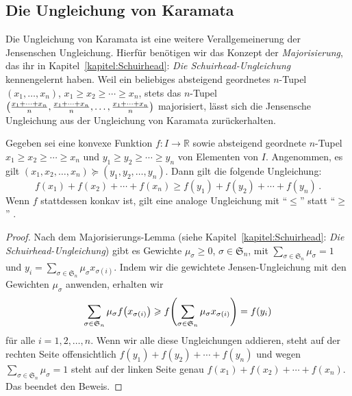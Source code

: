\subsection*{Die Ungleichung von Karamata}
Die Ungleichung von Karamata ist eine weitere Verallgemeinerung der Jensenschen Ungleichung. Hierfür benötigen wir das Konzept der \emph{Majorisierung}, das ihr in Kapitel~\ref{kapitel:Schuirhead}: \emph{Die Schuirhead-Ungleichung} kennengelernt haben. Weil ein beliebiges absteigend geordnetes $n$-Tupel $(x_1,\dotsc,x_n)$, $x_1\geqslant x_2\geqslant \dotsb\geqslant x_n$, stets das $n$-Tupel $\parens[\big]{\frac{x_1+\dotsb+x_n}{n},\frac{x_1+\dotsb+x_n}{n},\dotsc,\frac{x_1+\dotsb+x_n}{n}}$ majorisiert, lässt sich die Jensensche Ungleichung aus der Ungleichung von Karamata zurückerhalten.
\begin{satzmitnamen}
	Gegeben sei eine konvexe Funktion $f\colon I\rightarrow \mathbb R$ sowie absteigend geordnete $n$-Tupel $x_1\geqslant x_2\geqslant \dotsb\geqslant x_n$ und $y_1\geqslant y_2\geqslant \dotsb\geqslant y_n$ von Elementen von $I$. Angenommen, es gilt $(x_1,x_2,\dotsc,x_n)\succcurlyeq(y_1,y_2,\dotsc,y_n)$. Dann gilt die folgende Ungleichung:
	\begin{equation*}
		f(x_1)+f(x_2)+\dotsb+f(x_n)\geqslant f(y_1)+f(y_2)+\dotsb+f(y_n)\,.
	\end{equation*}
	Wenn $f$ stattdessen konkav ist, gilt eine analoge Ungleichung mit \enquote{$\leqslant$} statt \enquote{$\geqslant$} .
\end{satzmitnamen}
\begin{proof}
	Nach dem Majorisierungs-Lemma (siehe Kapitel~\ref{kapitel:Schuirhead}: \emph{Die Schuirhead-Ungleichung}) gibt es Gewichte $\mu_\sigma\geqslant 0$, $\sigma\in\mathfrak S_n$, mit $\sum_{\sigma\in\mathfrak S_n}\mu_\sigma=1$ und $y_i=\sum_{\sigma\in\mathfrak S_n}\mu_\sigma x_{\sigma(i)}$. Indem wir die gewichtete Jensen-Ungleichung mit den Gewichten $\mu_\sigma$ anwenden, erhalten wir
	\begin{equation*}
		\sum_{\sigma\in\mathfrak S_n}\mu_\sigma f\parens*{x_{\sigma(i)}}\geqslant f\parens*{\sum_{\sigma\in\mathfrak S_n}\mu_\sigma x_{\sigma(i)}}=f(y_i)
	\end{equation*}
	für alle $i=1,2,\dotsc,n$. Wenn wir alle diese Ungleichungen addieren, steht auf der rechten Seite offensichtlich $f(y_1)+f(y_2)+\dotsb+f(y_n)$ und wegen $\sum_{\sigma\in\mathfrak S_n}\mu_\sigma=1$ steht auf der linken Seite genau $f(x_1)+f(x_2)+\dotsb+f(x_n)$. Das beendet den Beweis.
\end{proof}

